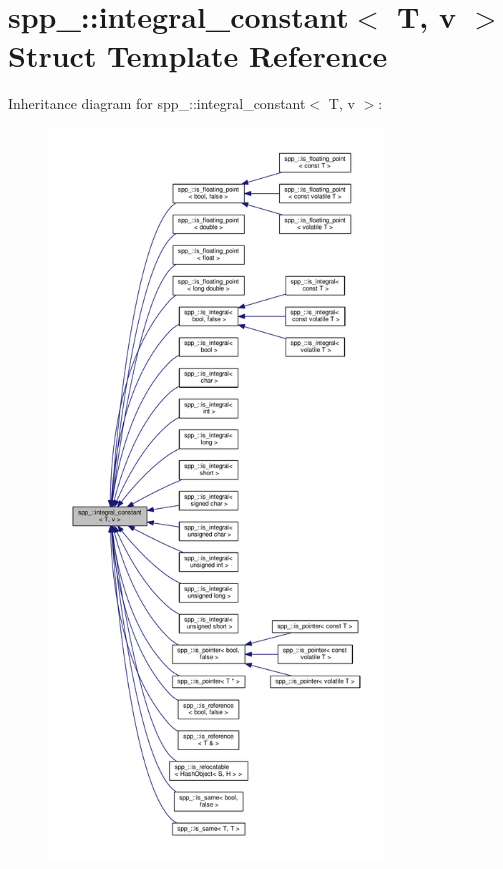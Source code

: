 \hypertarget{structspp___1_1integral__constant}{}\section{spp\+\_\+\+:\+:integral\+\_\+constant$<$ T, v $>$ Struct Template Reference}
\label{structspp___1_1integral__constant}


Inheritance diagram for spp\+\_\+\+:\+:integral\+\_\+constant$<$ T, v $>$\+:\nopagebreak
\begin{figure}[H]
\begin{center}
\leavevmode
\includegraphics[height=550pt]{structspp___1_1integral__constant__inherit__graph}
\end{center}
\end{figure}


